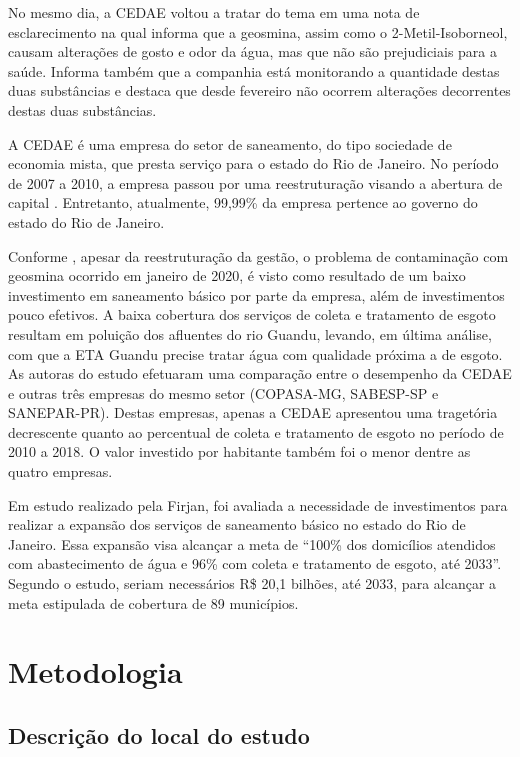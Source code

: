 \documentclass[
  12pt,
]{book}
\begin{document}
No mesmo dia, a CEDAE voltou a tratar do tema em uma nota de esclarecimento na qual informa que a geosmina, assim como o 2-Metil-Isoborneol, causam alterações de gosto e odor da água, mas que não são prejudiciais para a saúde. Informa também que a companhia está monitorando a quantidade destas duas substâncias e destaca que desde fevereiro não ocorrem alterações decorrentes destas duas substâncias.

A CEDAE é uma empresa do setor de saneamento, do tipo sociedade de economia mista, que presta serviço para o estado do Rio de Janeiro. No período de 2007 a 2010, a empresa passou por uma reestruturação visando a abertura de capital \citep{novacedae}. Entretanto, atualmente, 99,99\% da empresa pertence ao governo do estado do Rio de Janeiro.

Conforme \citet{crisecedae}, apesar da reestruturação da gestão, o problema de contaminação com geosmina ocorrido em janeiro de 2020, é visto como resultado de um baixo investimento em saneamento básico por parte da empresa, além de investimentos pouco efetivos. A baixa cobertura dos serviços de coleta e tratamento de esgoto resultam em poluição dos afluentes do rio Guandu, levando, em última análise, com que a ETA Guandu precise tratar água com qualidade próxima a de esgoto. As autoras do estudo efetuaram uma comparação entre o desempenho da CEDAE e outras três empresas do mesmo setor (COPASA-MG, SABESP-SP e SANEPAR-PR). Destas empresas, apenas a CEDAE apresentou uma tragetória decrescente quanto ao percentual de coleta e tratamento de esgoto no período de 2010 a 2018. O valor investido por habitante também foi o menor dentre as quatro empresas.

Em estudo realizado pela Firjan, foi avaliada a necessidade de investimentos para realizar a expansão dos serviços de saneamento básico no estado do Rio de Janeiro. Essa expansão visa alcançar a meta de ``100\% dos domicílios atendidos com abastecimento de água e 96\% com coleta e tratamento de esgoto, até 2033''. Segundo o estudo, seriam necessários R\$ 20,1 bilhões, até 2033, para alcançar a meta estipulada de cobertura de 89 municípios.

\hypertarget{intro}{%
\chapter{Metodologia}\label{intro}}

\hypertarget{descriuxe7uxe3o-do-local-do-estudo}{%
\section{Descrição do local do estudo}\label{descriuxe7uxe3o-do-local-do-estudo}}
\end{document}
